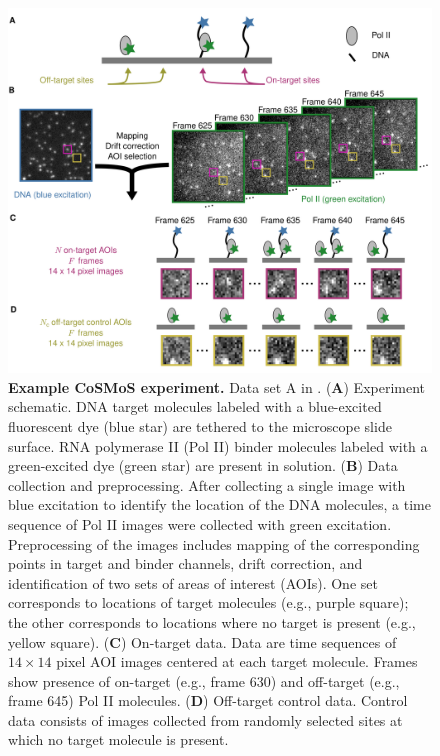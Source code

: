 \begin{figure}
\begin{fullwidth}
\centering
\includegraphics[width=145mm]{figures/cosmos_experiment/cosmos_experiment.png}
\caption{\textbf{Example CoSMoS experiment.} Data set A in . (\textbf{A}) Experiment schematic. DNA target molecules labeled with a blue-excited fluorescent dye (blue star) are tethered to the microscope slide surface. RNA polymerase II (Pol II) binder molecules labeled with a green-excited dye (green star) are present in solution. (\textbf{B}) Data collection and preprocessing. After collecting a single image with blue excitation to identify the location of the DNA molecules, a time sequence of Pol II images were collected with green excitation.  Preprocessing of the images includes mapping of the corresponding points in target and binder channels, drift correction, and identification of two sets of areas of interest (AOIs).  One set corresponds to locations of target molecules (e.g., purple square); the other corresponds to locations where no target is present (e.g., yellow square). (\textbf{C}) On-target data. Data are time sequences of $14 \times 14$ pixel AOI images centered at each target molecule. Frames show presence of on-target (e.g., frame 630) and off-target (e.g., frame 645) Pol II molecules. (\textbf{D}) Off-target control data. Control data consists of images collected from randomly selected sites at which no target molecule is present. }
\label{fig:cosmos_experiment}
\end{fullwidth}
\end{figure}